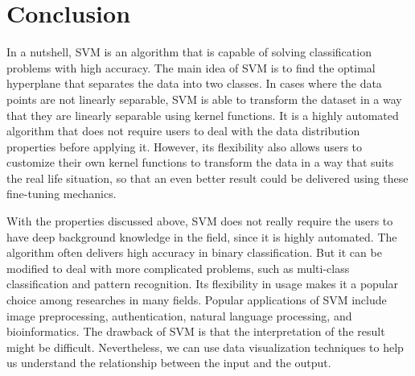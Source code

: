 
\section{Conclusion}
In a nutshell, SVM is an algorithm that is capable of solving classification
problems with high accuracy. The main idea of SVM is to find the optimal
hyperplane that separates the data into two classes. In cases where the data
points are not linearly separable, SVM is able to transform 
the dataset in a way that they are linearly separable using kernel functions.
It is a highly automated algorithm that does not require users to deal with
the data distribution properties before applying it. However, its flexibility
also allows users to customize their own kernel functions to transform the data
in a way that suits the real life situation, so that an even better result
could be delivered using these fine-tuning mechanics.

With the properties discussed above, SVM does not really require the users to have deep background
knowledge in the field, since it is highly automated.
The algorithm often delivers high accuracy in binary classification. But it can be modified to deal 
with more complicated problems, such as multi-class classification and
pattern recognition. Its flexibility in usage makes it a popular choice among
researches in many fields. 
Popular applications of SVM include image preprocessing, authentication, natural language
processing, and bioinformatics.
The drawback of SVM is that the interpretation of the
result might be difficult. Nevertheless, we can use data visualization techniques
to help us understand the relationship between the input and the output.
